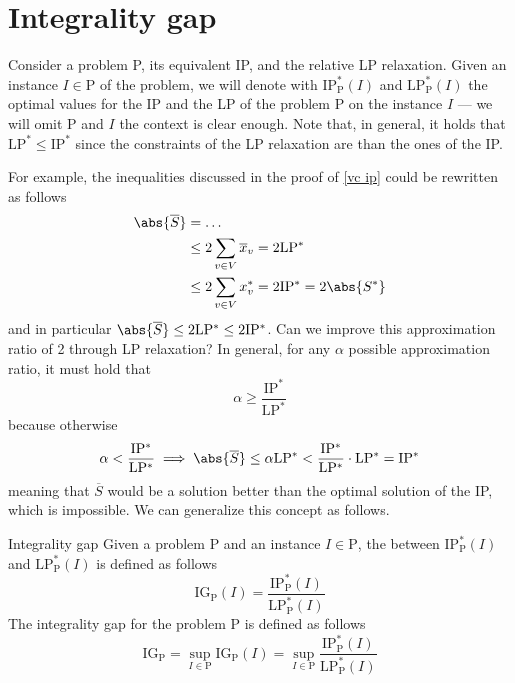 \documentclass[a4paper, 12pt]{report}
\begin{document}
    \section{Integrality gap}

    Consider a problem P, its equivalent IP, and the relative LP relaxation. Given an instance $I \in \mathrm P$ of the problem, we will denote with $\mathrm{IP^*_P}(I)$ and $\mathrm{LP^*_P}(I)$ the optimal values for the IP and the LP of the problem P on the instance $I$ --- we will omit P and $I$ the context is clear enough. Note that, in general, it holds that $\mathrm{LP^*} \le \mathrm{IP^*}$ since the constraints of the LP relaxation are  than the ones of the IP.

    For example, the inequalities discussed in the proof of \cref{vc ip} could be rewritten as follows
    \begin{equation*}
        \begin{split}
            \abs{\overline S} &= \ldots \\
                              &\le 2 \sum_{v \in V}{\overline x_v} = 2 \mathrm{LP^*} \\
                              &\le 2 \sum_{v \in V}{x^*_v} = 2 \mathrm{IP^*} = 2 \abs{S^*}\\
        \end{split}
    \end{equation*}
    and in particular $\abs{\overline S} \le 2 \mathrm{LP^*} \le 2 \mathrm{IP^*}$. Can we improve this approximation ratio of 2 through LP relaxation? In general, for any $\alpha$ possible approximation ratio, it must hold that $$\alpha \ge \dfrac{\mathrm{IP^*}}{\mathrm{LP^*}}$$ because otherwise $$\alpha < \mathrm{\dfrac{IP^*}{LP^*}} \implies \abs{\overline S} \le \alpha \mathrm{LP^*} < \mathrm{\dfrac{IP^*}{LP^*}} \cdot \mathrm{LP^*} = \mathrm{IP^*}$$ meaning that $\overline S$ would be a solution better than the optimal solution of the IP, which is impossible. We can generalize this concept as follows.

    \begin{frameddefn}{Integrality gap}
        Given a problem P and an instance $I \in \mathrm P$, the  between $\mathrm{IP^*_P}(I)$ and $\mathrm{LP^*_P}(I)$ is defined as follows $$\mathrm{IG_P}(I) = \dfrac{\mathrm{IP^*_P}(I)}{\mathrm{LP^*_P}(I)}$$ The integrality gap for the problem P is defined as follows $$\mathrm{IG_P} = \sup_{I \in \mathrm P}{\mathrm{IG_P}(I)} = \sup_{I \in \mathrm P}{\dfrac{\mathrm{IP^*_P}(I)}{\mathrm{LP^*_P}(I)}}$$
    \end{frameddefn}
\end{document}

